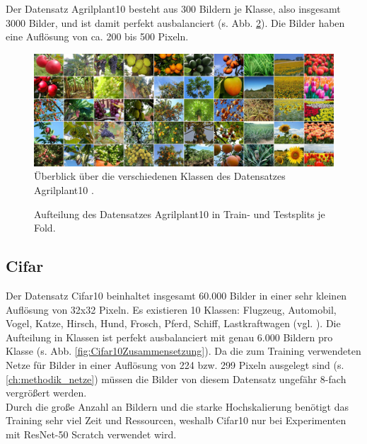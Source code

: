 Der Datensatz Agrilplant10 besteht aus 300 Bildern je Klasse, also insgesamt 3000 Bilder, und ist damit perfekt ausbalanciert (s. Abb. \ref{fig:Agrilplant10Zusammensetzung}).
Die Bilder haben eine Auflösung von ca. 200 bis 500 Pixeln. \\

\begin{figure}[H]
\includegraphics[scale=0.2]{img/2_agrilplant-image.jpg}
\caption{Überblick über die verschiedenen Klassen des Datensatzes Agrilplant10 \cite{pawaraAgrilplant}.}
\label{fig:agrilplantUeberblick}
\end{figure}

\begin{figure}[H]
\begin{adjustbox}{width=1.1\textwidth, center}

\end{adjustbox}
\caption{Aufteilung des Datensatzes Agrilplant10 \cite{pawaraWebsiteDatensaetze} in Train- und Testsplits je Fold.}
\label{fig:Agrilplant10Zusammensetzung}
\end{figure}


\subsection{Cifar}
\label{ch:methodik_datensaetzeCifar10}
Der Datensatz Cifar10 beinhaltet insgesamt 60.000 Bilder in einer sehr kleinen Auflösung von 32x32 Pixeln. Es existieren 10 Klassen: Flugzeug, Automobil, Vogel, Katze, Hirsch, Hund, Frosch, Pferd, Schiff, Lastkraftwagen (vgl. \cite{cifar10}).
Die Aufteilung in Klassen ist perfekt ausbalanciert mit genau 6.000 Bildern pro Klasse (s. Abb. \ref{fig:Cifar10Zusammensetzung}).
Da die zum Training verwendeten Netze für Bilder in einer Auflösung von 224 bzw. 299 Pixeln ausgelegt sind (s. \ref{ch:methodik_netze}) müssen die Bilder von diesem Datensatz ungefähr 8-fach vergrößert werden.\\

Durch die große Anzahl an Bildern und die starke Hochskalierung benötigt das Training sehr viel Zeit und Ressourcen, weshalb Cifar10 nur bei Experimenten mit ResNet-50 Scratch verwendet wird.

